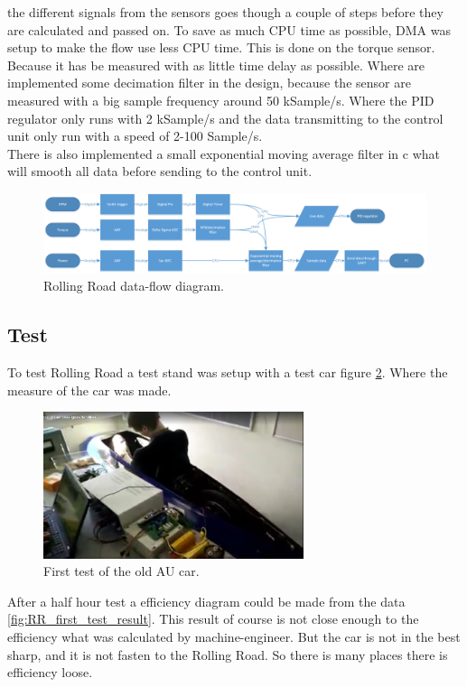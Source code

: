 the different signals from the sensors goes though a couple of steps before they are calculated and passed on. To save as much CPU time as possible, DMA was setup to make the flow use less CPU time. This is done on the torque sensor. Because it has be measured with as little time delay as possible. Where are implemented some decimation filter in the design, because the sensor are measured with a big sample frequency around 50 kSample/s. Where the PID regulator only runs with 2 kSample/s and the data transmitting to the control unit only run with a speed of 2-100 Sample/s.\\
There is also implemented a small exponential moving average filter in c what will smooth all data before sending to the control unit.    
\begin{figure}[H]
	\centering
	\includegraphics [width=6in]{../Documentation_RR/Software/Pictures/data-flow.png}
	\caption{Rolling Road data-flow diagram.}
	\label{fig:data_flow_diagram}
\end{figure}
\subsection{Test}
To test Rolling Road a test stand was setup with a test car figure \ref{fig:RR_first_test}. Where the measure of the car was made. 
\begin{figure}[H]
	\centering
	\includegraphics [width=3in]{SubPages/Images/jens_test.png}
	\caption{First test of the old AU car.}
	\label{fig:RR_first_test}
\end{figure}
After a half hour test a efficiency diagram could be made from the data \ref{fig:RR_first_test_result}.
This result of course is not close enough to the efficiency what was calculated by machine-engineer. But the car is not in the best sharp, and it is not fasten to the Rolling Road. So there is many places there is efficiency loose.


